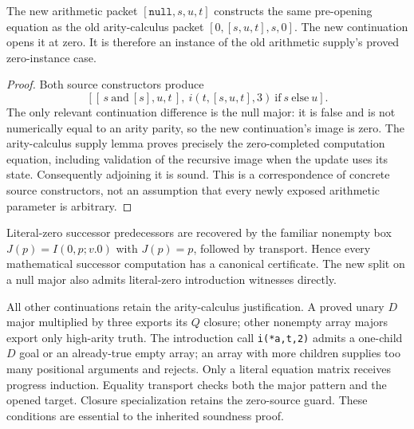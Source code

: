 \begin{lemma}
The new arithmetic packet $[\mathtt{null},s,u,t]$ constructs the same pre-opening equation as the old arity-calculus packet $[0,[s,u,t],s,0]$. The new continuation opens it at zero. It is therefore an instance of the old arithmetic supply's proved zero-instance case.
\end{lemma}
\begin{proof}
Both source constructors produce
\[
 [[\,s\ \mathrm{and}\ [s],u,t\,],\ i(t,[s,u,t],3)\ \mathrm{if}\ s\ \mathrm{else}\ u].
\]
The only relevant continuation difference is the null major: it is false and is not numerically equal to an arity parity, so the new continuation's image is zero. The arity-calculus supply lemma proves precisely the zero-completed computation equation, including validation of the recursive image when the update uses its state. Consequently adjoining it is sound. This is a correspondence of concrete source constructors, not an assumption that every newly exposed arithmetic parameter is arbitrary.
\end{proof}

Literal-zero successor predecessors are recovered by the familiar nonempty box $J(p)=I(0,p;v.0)$ with $J(p)=p$, followed by transport. Hence every mathematical successor computation has a canonical certificate. The new split on a null major also admits literal-zero introduction witnesses directly.

All other continuations retain the arity-calculus justification. A proved unary $D$ major multiplied by three exports its $Q$ closure; other nonempty array majors export only high-arity truth. The introduction call \texttt{i(*a,t,2)} admits a one-child $D$ goal or an already-true empty array; an array with more children supplies too many positional arguments and rejects. Only a literal equation matrix receives progress induction. Equality transport checks both the major pattern and the opened target. Closure specialization retains the zero-source guard. These conditions are essential to the inherited soundness proof.

